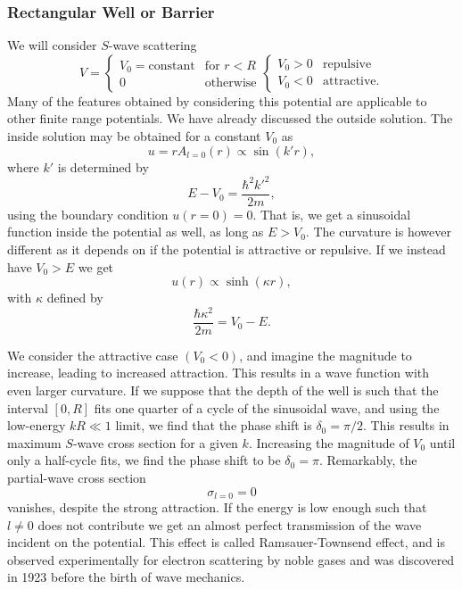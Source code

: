 \subsubsection{Rectangular Well or Barrier}
We will consider $S$-wave scattering 
\begin{equation}
    V = 
    \begin{cases}
        V_0 = \text{constant}   & \text{for } r<R\\
        0                       & \text{otherwise}
    \end{cases}
    \begin{cases}
        V_0>0   & \text{repulsive}\\
        V_0<0   & \text{attractive}.
    \end{cases}
\end{equation}
Many of the features obtained by considering this potential are applicable to other finite range potentials. We have already discussed the outside solution. The inside solution may be obtained for a constant $V_0$ as
\begin{equation}
    u = r A_{l=0}(r) \propto \sin(k'r),
\end{equation} 
where $k'$ is determined by
\begin{equation}
    E - V_0 = \frac{\hbar^2 k'^2}{2m},
\end{equation}
using the boundary condition $u(r=0) = 0$. That is, we get a sinusoidal function inside the potential as well, as long as $E>V_0$. The curvature is however different as it depends on if the potential is attractive or repulsive. If we instead have $V_0>E$ we get 
\begin{equation}
    u(r) \propto \sinh(\kappa r),
\end{equation}
with $\kappa$ defined by
\begin{equation}
    \frac{\hbar \kappa^2}{2m}  = V_0 - E.
\end{equation}

We consider the attractive case $(V_0<0)$, and imagine the magnitude to increase, leading to increased attraction. This results in a wave function with even larger curvature. If we suppose that the depth of the well is such that the interval $[0,R]$ fits one quarter of a cycle of the sinusoidal wave, and using the low-energy $kR \ll 1$ limit, we find that the phase shift is $\delta_0 = \pi/2$. This results in maximum $S$-wave cross section for a given $k$. Increasing the magnitude of $V_0$ until only a half-cycle fits, we find the phase shift to be $\delta_0 = \pi$. Remarkably, the partial-wave cross section 
\begin{equation}
    \sigma_{l=0} = 0
\end{equation}
vanishes, despite the strong attraction. If the energy is low enough such that $l\neq 0$ does not contribute we get an almost perfect transmission of the wave incident on the potential. This effect is called Ramsauer-Townsend effect, and is observed experimentally for electron scattering by noble gases and was discovered in 1923 before the birth of wave mechanics.
